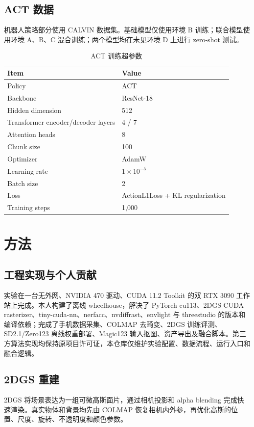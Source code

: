 \documentclass[10pt]{ctexart}
\begin{document}
\subsection{ACT 数据}
机器人策略部分使用 CALVIN 数据集。基础模型仅使用环境 B 训练；联合模型使用环境 A、B、C 混合训练；两个模型均在未见环境 D 上进行 zero-shot 测试。

\begin{table}[H]
\centering
\caption{ACT 训练超参数}
\begin{tabular}{ll}
\toprule
Item & Value \\
\midrule
Policy & ACT \\
Backbone & ResNet-18 \\
Hidden dimension & 512 \\
Transformer encoder/decoder layers & 4 / 7 \\
Attention heads & 8 \\
Chunk size & 100 \\
Optimizer & AdamW \\
Learning rate & $1\times10^{-5}$ \\
Batch size & 2 \\
Loss & ActionL1Loss + KL regularization \\
Training steps & 1,000 \\
\bottomrule
\end{tabular}
\end{table}

\section{方法}
\subsection{工程实现与个人贡献}
实验在一台无外网、NVIDIA 470 驱动、CUDA 11.2 Toolkit 的双 RTX 3090 工作站上完成。本人构建了离线 wheelhouse，解决了 PyTorch cu113、2DGS CUDA rasterizer、tiny-cuda-nn、nerfacc、nvdiffrast、envlight 与 threestudio 的版本和编译依赖；完成了手机数据采集、COLMAP 去畸变、2DGS 训练评测、SD2.1/Zero123 离线权重部署、Magic123 输入抠图、资产导出及融合脚本。第三方算法实现均保持原项目许可证，本仓库仅维护实验配置、数据流程、运行入口和融合逻辑。

\subsection{2DGS 重建}
2DGS 将场景表达为一组可微高斯面片，通过相机投影和 alpha blending 完成快速渲染。真实物体和背景均先由 COLMAP 恢复相机内外参，再优化高斯的位置、尺度、旋转、不透明度和颜色参数。
\end{document}
